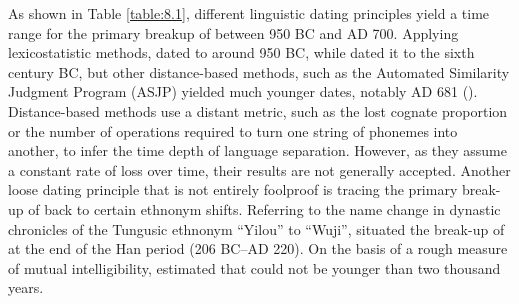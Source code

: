 \documentclass[output=paper,colorlinks,citecolor=brown]{langscibook}
\begin{document}
As shown in Table \ref{table:8.1}, different linguistic dating principles yield a time range for the primary breakup of  between 950 BC and AD 700. Applying lexicostatistic methods, \citet{Dybo2019} dated  to around 950 BC, while \citet{Korovina2011} dated it to the sixth century BC, but other distance-based methods, such as the Automated Similarity Judgment Program (ASJP) yielded much younger dates, notably AD 681 (\citealt[854]{Holman2011}). Distance-based methods use a distant metric, such as the lost cognate proportion or the number of operations required to turn one string of phonemes into another, to infer the time depth of language separation. However, as they assume a constant rate of loss over time, their results are not generally accepted. Another loose dating principle that is not entirely foolproof is tracing the primary break-up of  back to certain ethnonym shifts. Referring to the name change in  dynastic chronicles of the Tungusic ethnonym “Yilou” to “Wuji”, \citet[16–18]{Robbeets2015} situated the break-up of  at the end of the Han period (206 BC--AD 220). On the basis of a rough measure of mutual intelligibility, \citet[32]{Pevnov2012} estimated that  could not be younger than two thousand years.
\end{document}
